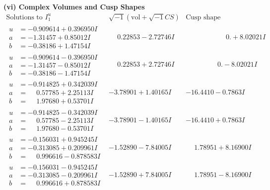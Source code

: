\documentclass[1p]{elsarticle_modified}
\theoremstyle{definition}
\newcommand{\I}{\sqrt{-1}}
\begin{document}
\newpage\flushleft \textbf{(vi) Complex Volumes and Cusp Shapes}
$$\begin{array}{c|c|c}  
\text{Solutions to }I^u_{1}& \I (\text{vol} + \sqrt{-1}CS) & \text{Cusp shape}\\
 \hline 
\begin{aligned}
u &= -0.909614 + 0.396950 I \\
a &= -1.31457 + 0.85012 I \\
b &= -0.38186 + 1.47154 I\end{aligned}
 & \phantom{-}0.22853 - 2.72746 I & \phantom{-0.000000 -}0. + 8.02021 I \\ \hline\begin{aligned}
u &= -0.909614 - 0.396950 I \\
a &= -1.31457 - 0.85012 I \\
b &= -0.38186 - 1.47154 I\end{aligned}
 & \phantom{-}0.22853 + 2.72746 I & \phantom{-0.000000 } 0. - 8.02021 I \\ \hline\begin{aligned}
u &= -0.914825 + 0.342039 I \\
a &= \phantom{-}0.57785 + 2.25113 I \\
b &= \phantom{-}1.97680 + 0.53701 I\end{aligned}
 & -3.78901 + 1.40165 I & -16.4410 - 0.7863 I \\ \hline\begin{aligned}
u &= -0.914825 - 0.342039 I \\
a &= \phantom{-}0.57785 - 2.25113 I \\
b &= \phantom{-}1.97680 - 0.53701 I\end{aligned}
 & -3.78901 - 1.40165 I & -16.4410 + 0.7863 I \\ \hline\begin{aligned}
u &= -0.156031 + 0.945245 I \\
a &= -0.313085 + 0.209961 I \\
b &= \phantom{-}0.996616 - 0.878583 I\end{aligned}
 & -1.52890 - 7.84005 I & \phantom{-}1.78951 + 8.16900 I \\ \hline\begin{aligned}
u &= -0.156031 - 0.945245 I \\
a &= -0.313085 - 0.209961 I \\
b &= \phantom{-}0.996616 + 0.878583 I\end{aligned}
 & -1.52890 + 7.84005 I & \phantom{-}1.78951 - 8.16900 I \\ \hline\begin{aligned}

\end{aligned}
\end{array}$$
\end{document}
